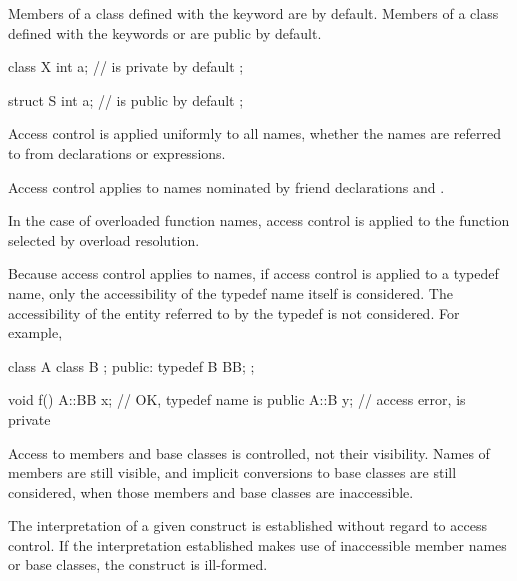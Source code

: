 \pnum
{}%
%
%
Members of a class defined with the keyword
are
by default.
Members of a class defined with the keywords
 or 
are public by default.
\begin{example}
\begin{codeblock}
class X {
  int a;            //  is private by default
};

struct S {
  int a;            //  is public by default
};
\end{codeblock}
\end{example}

\pnum
Access control is applied uniformly to all names, whether the names are
referred to from declarations or expressions.
\begin{note}
Access control applies to names nominated by
friend declarations and
.
\end{note}
In the case of overloaded function names, access control is applied to
the function selected by overload resolution.
\begin{note}
Because access control applies to names, if access control is applied to a
typedef name, only the accessibility of the typedef name itself is considered.
The accessibility of the entity referred to by the typedef is not considered.
For example,

\begin{codeblock}
class A {
  class B { };
public:
  typedef B BB;
};

void f() {
  A::BB x;          // OK, typedef name  is public
  A::B y;           // access error,  is private
}
\end{codeblock}
\end{note}

\pnum
\begin{note}
Access to members and base classes is controlled, not their
visibility.
Names of members are still visible, and implicit conversions to base
classes are still considered, when those members and base classes are
inaccessible.
\end{note}
The interpretation of a given construct is
established without regard to access control.
If the interpretation
established makes use of inaccessible member names or base classes,
the construct is ill-formed.

